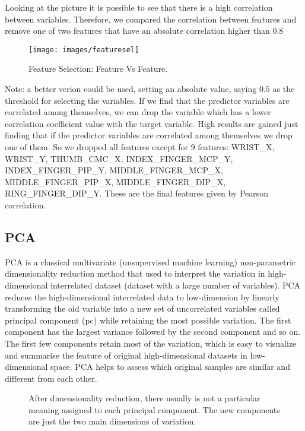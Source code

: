 \noindent Looking at the picture it is possible to see that there is a high correlation between variables. Therefore, we compared the correlation between features and remove one of two features that have an absolute correlation higher than $0.8$

\begin{figure}[H]
	\centering
	\texttt{[image: images/featuresel]}
	\caption[Feature Selection: Feature Vs Feature.]{Feature Selection: Feature Vs Feature.}
	\label{fig:featuresel}
\end{figure}

\noindent Note: a better verion could be used, setting an absolute value, saying $0.5$ as the threshold for selecting the variables. If we find that the predictor variables are correlated among themselves, we can drop the variable which has a lower correlation coefficient value with the target variable. High results are gained just finding that if the predictor variables are correlated among themselves we drop one of them. So we dropped all features except for $9$ features: WRIST\_X, WRIST\_Y, THUMB\_CMC\_X, INDEX\_FINGER\_MCP\_Y, INDEX\_FINGER\_PIP\_Y, MIDDLE\_FINGER\_MCP\_X, MIDDLE\_FINGER\_PIP\_X, MIDDLE\_FINGER\_DIP\_X, RING\_FINGER\_DIP\_Y. These are the final features given by Pearson correlation.

\subsection{PCA}
\label{sec:pca}
PCA is a classical multivariate (unsupervised machine learning) non-parametric dimensionality reduction method that used to interpret the variation in high-dimensional interrelated dataset (dataset with a large number of variables). PCA reduces the high-dimensional interrelated data to low-dimension by linearly transforming the old variable into a new set of uncorrelated variables called principal component (\gls{pc}) while retaining the most possible variation. The first component has the largest variance followed by the second component and so on. The first few components retain most of the variation, which is easy to visualize and summarise the feature of original high-dimensional datasets in low-dimensional space. PCA helps to assess which original samples are similar and different from each other.

\begin{figure}[htbp]
	\caption[PCA - Biplot.]{After dimensionality reduction, there usually is not a particular meaning assigned to each principal component. The new components are just the two main dimensions of variation.}\label{fig:bipca}
\end{figure}

